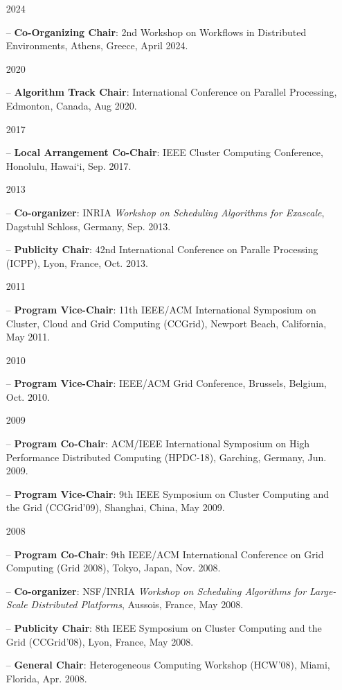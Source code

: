 \documentclass[times,11pt]{letter}
\begin{document}
\begin{itemize}
\item [2024]
\item[--] {\bf Co-Organizing Chair}: 2nd Workshop on Workflows in Distributed Environments, Athens, Greece, April 2024.
\item [2020]
\item[--] {\bf Algorithm Track Chair}: International Conference on Parallel Processing, Edmonton, Canada, Aug 2020.
\item [2017]
\item[--] {\bf Local Arrangement Co-Chair}: IEEE Cluster Computing Conference, Honolulu, Hawai`i, Sep. 2017. 
\item [2013]
\item[--] {\bf Co-organizer}: INRIA \emph{Workshop on Scheduling Algorithms for Exascale}, Dagstuhl Schloss, Germany, Sep. 2013.
\item[--] {\bf Publicity Chair}: 42nd International Conference on Paralle Processing (ICPP),  Lyon, France, Oct. 2013.
\item [2011]
\item[--] {\bf Program Vice-Chair}: 11th IEEE/ACM International Symposium on Cluster, Cloud and Grid Computing (CCGrid), Newport Beach, California, May 2011.
\item [2010]
\item[--] {\bf Program Vice-Chair}: IEEE/ACM Grid Conference, Brussels, Belgium, Oct. 2010.
\item [2009]
\item[--] {\bf Program Co-Chair}: ACM/IEEE International Symposium on High Performance Distributed Computing (HPDC-18), Garching, Germany, Jun. 2009.
\item[--] {\bf Program Vice-Chair}: 9th IEEE Symposium on Cluster Computing and the Grid (CCGrid'09), Shanghai, China, May 2009.
\item [2008]
\item[--] {\bf Program Co-Chair}: 9th IEEE/ACM International Conference on Grid Computing (Grid 2008), Tokyo, Japan, Nov. 2008.
\item[--] {\bf Co-organizer}: NSF/INRIA \emph{Workshop on Scheduling Algorithms for Large-Scale Distributed Platforms}, Aussois, France, May 2008.
\item[--] {\bf Publicity Chair}: 8th IEEE Symposium on Cluster Computing and the Grid (CCGrid'08), Lyon, France, May 2008.
\item[--] {\bf General Chair}: Heterogeneous Computing Workshop (HCW'08), Miami, Florida, Apr. 2008.

\end{itemize}
\end{document}
